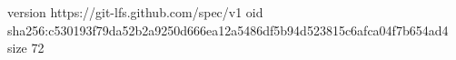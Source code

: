 version https://git-lfs.github.com/spec/v1
oid sha256:c530193f79da52b2a9250d666ea12a5486df5b94d523815c6afca04f7b654ad4
size 72
